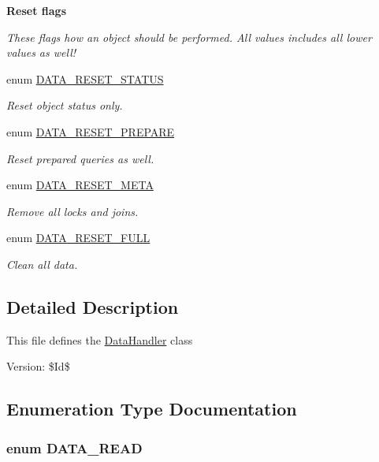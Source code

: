 \begin{Indent}{\bf Reset flags}\par
{\em These flags how an object should be performed. All values includes all lower values as well! }\begin{CompactItemize}
\item 
enum \hyperlink{class_8datahandler_8php_9266811d651cb3ff8c5fdf00111e677b}{DATA\_\-RESET\_\-STATUS} 
\begin{CompactList}\small\item\em Reset object status only. \item\end{CompactList}\item 
enum \hyperlink{class_8datahandler_8php_19a99423705b41e563424ae76d7fe184}{DATA\_\-RESET\_\-PREPARE} 
\begin{CompactList}\small\item\em Reset prepared queries as well. \item\end{CompactList}\item 
enum \hyperlink{class_8datahandler_8php_3ce9f928f9ba75096925bd4157246bbb}{DATA\_\-RESET\_\-META} 
\begin{CompactList}\small\item\em Remove all locks and joins. \item\end{CompactList}\item 
enum \hyperlink{class_8datahandler_8php_2a28429433990da242faa223d5a49f0a}{DATA\_\-RESET\_\-FULL} 
\begin{CompactList}\small\item\em Clean all data. \item\end{CompactList}\end{CompactItemize}
\end{Indent}


\subsection{Detailed Description}
This file defines the \hyperlink{classDataHandler}{DataHandler} class \begin{Desc}
\item[Version:]\$Id\$ \end{Desc}


\subsection{Enumeration Type Documentation}
\hypertarget{class_8datahandler_8php_c28f74b49007773d24ca2207baac6d32}{
\subsubsection{\setlength{\rightskip}{0pt plus 5cm}enum {\bf DATA\_\-READ}}}
\label{class_8datahandler_8php_c28f74b49007773d24ca2207baac6d32}


